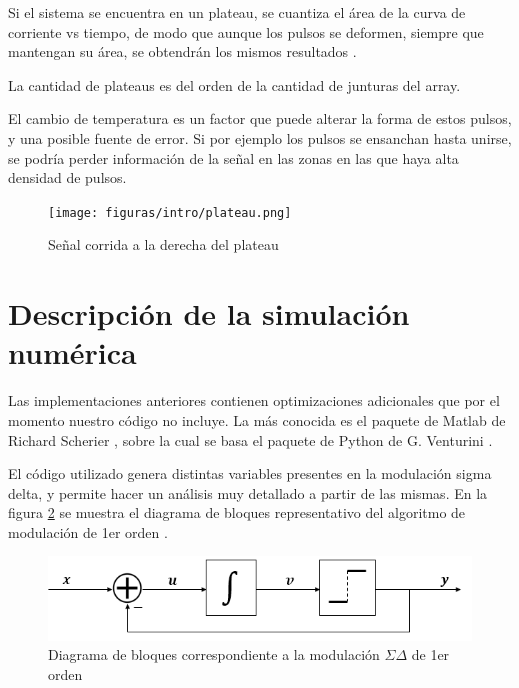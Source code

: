 \documentclass[twoside]{article}
\begin{document}
\begin{multicols}{2}
Si el sistema se encuentra en un plateau, se cuantiza el área de la curva de corriente vs tiempo, de modo que aunque los pulsos se deformen, siempre que mantengan su área, se obtendrán los mismos resultados \cite{benz1998}. 

La cantidad de plateaus es del orden de la cantidad de junturas del array. %

El cambio de temperatura es un factor que puede alterar la forma de estos pulsos, y una posible fuente de error. Si por ejemplo los pulsos se ensanchan hasta unirse, se podría perder información de la señal en las zonas en las que haya alta densidad de pulsos.



\begin{figure}[H]
    \centering
    \texttt{[image: figuras/intro/plateau.png]}
    \caption{Señal corrida a la derecha del plateau}
    \label{fig:intro_plateau}
\end{figure}

\section{Descripción de la simulación numérica}



Las implementaciones anteriores contienen optimizaciones adicionales que por el momento nuestro código no incluye. La más conocida es el paquete de Matlab de Richard Scherier \cite{DSmatlab}, sobre la cual se basa el paquete de Python de G. Venturini \cite{DSpython}.

El código utilizado genera distintas variables presentes en la modulación sigma delta, y permite hacer un análisis muy detallado a partir de las mismas. En la figura \ref{fig:bloques} se muestra el diagrama de bloques representativo del algoritmo de modulación de 1er orden \cite{script}.

\begin{figure}[H]
\centering
\includegraphics[width=\linewidth]{figuras/bloques_1erorden.png}
\caption{Diagrama de bloques correspondiente a la modulación $\Sigma\Delta$ de 1er orden}
\label{fig:bloques}
\end{figure}


\end{multicols}
\end{document}
